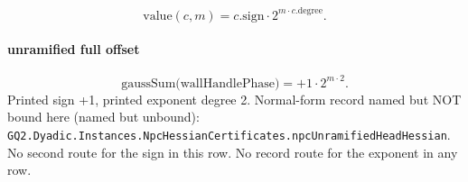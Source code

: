 \[\mathrm{value}(c,m)=c.\mathrm{sign}\cdot 2^{m\cdot c.\mathrm{degree}}.\]
\paragraph{unramified full offset}
\[\mathrm{gaussSum}\bigl(\mathrm{wallHandlePhase}\bigr)=+1\cdot 2^{m\cdot 2}.\]
Printed sign +1, printed exponent degree 2. Normal-form record named but NOT bound here (named but unbound): \texttt{GQ2.Dyadic.Instances.NpcHessianCertificates.npcUnramifiedHeadHessian}.
No second route for the sign in this row. No record route for the exponent in any row.
